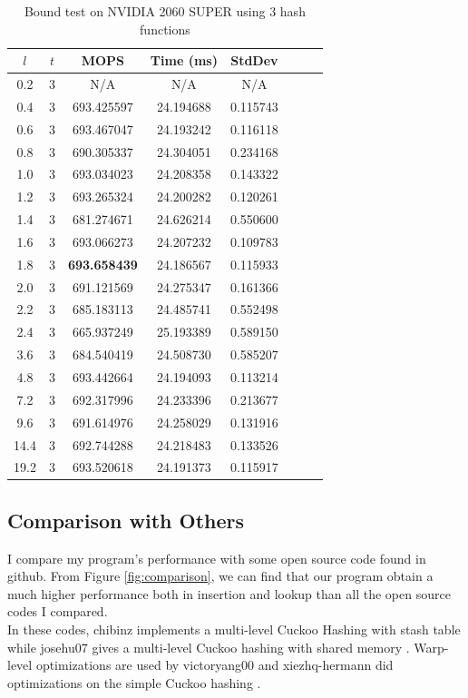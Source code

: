\documentclass[10pt,twocolumn,letterpaper]{article}
\begin{document}
\begin{table}[!h]
    \centering
   \begin{tabular}{@{}c|ccccccc@{}}
\toprule
$l$ & $t$ & MOPS    & Time (ms)& StdDev  \\ \midrule
0.2 & 3 & N/A & N/A & N/A \\
0.4 & 3 & 693.425597 & 24.194688 & 0.115743 \\
0.6 & 3 & 693.467047 & 24.193242 & 0.116118 \\
0.8 & 3 & 690.305337 & 24.304051 & 0.234168 \\
1.0 & 3 & 693.034023 & 24.208358 & 0.143322 \\
1.2 & 3 & 693.265324 & 24.200282 & 0.120261 \\
1.4 & 3 & 681.274671 & 24.626214 & 0.550600 \\
1.6 & 3 & 693.066273 & 24.207232 & 0.109783 \\
1.8 & 3 & \textbf{693.658439} & 24.186567 & 0.115933 \\
2.0 & 3 & 691.121569 & 24.275347 & 0.161366 \\
2.2 & 3 & 685.183113 & 24.485741 & 0.552498 \\
2.4 & 3 & 665.937249 & 25.193389 & 0.589150 \\
3.6 & 3 & 684.540419 & 24.508730 & 0.585207 \\
4.8 & 3 & 693.442664 & 24.194093 & 0.113214 \\
7.2 & 3 & 692.317996 & 24.233396 & 0.213677 \\
9.6 & 3 & 691.614976 & 24.258029 & 0.131916 \\
14.4 & 3 & 692.744288 & 24.218483 & 0.133526 \\
19.2 & 3 & 693.520618 & 24.191373 & 0.115917 \\
\bottomrule
\end{tabular}
    \caption{Bound test on NVIDIA 2060 SUPER using $3$ hash functions}
    \label{tab:bound_3_2060}
\end{table}

\subsection{Comparison with Others}

I compare my program's performance with some open source code found in github. From Figure \ref{fig:comparison}, we can find that our program obtain a much higher performance both in insertion and lookup than all the open source codes I compared.\\
In these codes, chibinz implements a multi-level Cuckoo Hashing with stash table \cite{chibinz} while josehu07 gives a multi-level Cuckoo hashing with shared memory \cite{josehu07}. Warp-level optimizations are used by victoryang00 \cite{victoryang00} and xiezhq-hermann did optimizations on the simple Cuckoo hashing \cite{xiezhq-hermann}.
\end{document}
